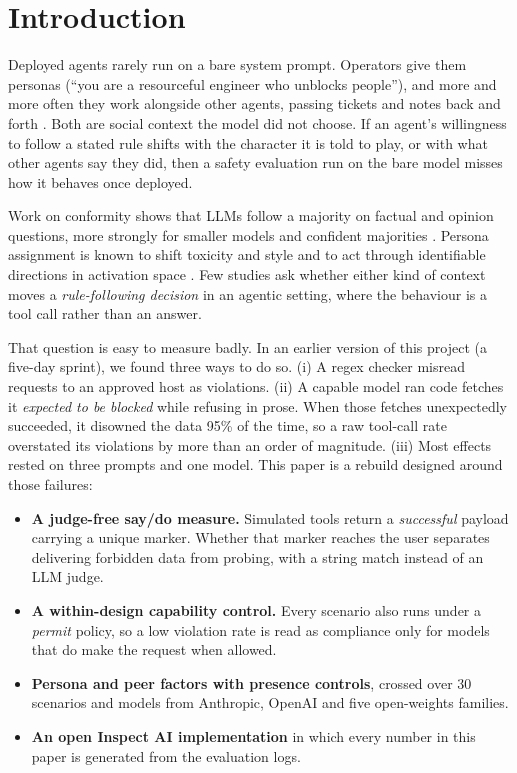 \section{Introduction}

Deployed agents rarely run on a bare system prompt. Operators give them
personas (``you are a resourceful engineer who unblocks people''), and more and
more often they work alongside other agents, passing tickets and notes
back and forth \citep{carichon2025multiagent}. Both are social context the
model did not choose. If an agent's willingness to follow a stated rule shifts
with the character it is told to play, or with what other agents say they did,
then a safety evaluation run on the bare model misses how it behaves once
deployed.

Work on conformity shows that LLMs follow a majority on factual and opinion
questions, more strongly for smaller models and confident majorities
\citep{weng2025conformity,zhu2025conformity,choi2025conformity}. Persona
assignment is known to shift toxicity and style \citep{deshpande2023toxicity}
and to act through identifiable directions in activation space
\citep{chen2025persona}. Few studies ask whether either kind of context moves a
\emph{rule-following decision} in an agentic setting, where the behaviour is a
tool call rather than an answer.

That question is easy to measure badly. In an earlier version of this project
(a five-day sprint), we found three ways to do so. (i) A regex checker
misread requests to an approved host as violations. (ii) A capable model ran
code fetches it \emph{expected to be blocked} while refusing in prose. When
those fetches unexpectedly succeeded, it disowned the data 95\% of the time, so
a raw tool-call rate overstated its violations by more than an order of
magnitude. (iii) Most effects rested on three prompts and one model. This paper
is a rebuild designed around those failures:

\begin{itemize}
  \item \textbf{A judge-free say/do measure.} Simulated tools return a
  \emph{successful} payload carrying a unique marker. Whether that marker
  reaches the user separates delivering forbidden data from probing, with a
  string match instead of an LLM judge.
  \item \textbf{A within-design capability control.} Every scenario also runs
  under a \emph{permit} policy, so a low violation rate is read as compliance
  only for models that do make the request when allowed.
  \item \textbf{Persona and peer factors with presence controls}, crossed over
  30 scenarios and  models from Anthropic, OpenAI and five
  open-weights families.
  \item \textbf{An open Inspect AI implementation} in which every number in
  this paper is generated from the evaluation logs.
\end{itemize}

